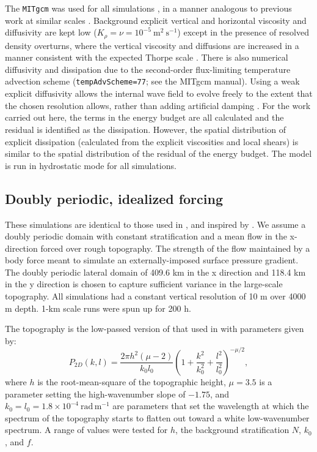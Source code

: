 \documentclass[twocol]{ametsocV5}
\begin{document}
The \verb+MITgcm+ was used for all simulations \citep{marshalletal97}, in a manner analogous to previous work at similar scales \citep{buijsmanetal14,klymaketal16b, klymak18}.  Background explicit vertical and horizontal viscosity and diffusivity are kept low ($K_{\rho} = \nu = 10^{-5}\ \mathrm{m^2\ s^{-1}}$) except in the presence of resolved density overturns, where the vertical viscosity and diffusions are increased in a manner consistent with the expected Thorpe scale \citep{klymaklegg10}.  There is also numerical diffusivity and dissipation due to the second-order flux-limiting temperature advection scheme (\verb+tempAdvScheme=77+; see the MITgcm manual).  Using a weak explicit diffusivity allows the internal wave field to evolve freely to the extent that the chosen resolution allows, rather than adding artificial damping \citep{ShakespeareHogg17}.  For the work carried out here, the terms in the energy budget are all calculated and the residual is identified as the dissipation.  However, the spatial distribution of explicit dissipation (calculated from the explicit viscosities and local shears) is similar to the spatial distribution of the residual of the energy budget.  The model is run in hydrostatic mode for all simulations.

\subsection{Doubly periodic, idealized forcing}

These simulations are identical to those used in \citet{klymak18}, and inspired by \citet{nikurashinferrari14}.  We assume a doubly periodic domain with constant stratification and a mean flow in the x-direction forced over rough topography.  The strength of the flow maintained by a body force meant to simulate an externally-imposed surface pressure gradient.  The doubly periodic lateral domain of 409.6 km in the x direction and 118.4 km in the y direction is chosen to capture sufficient variance in the large-scale topography. All simulations had a constant vertical resolution of 10 m over 4000 m depth.  1-km scale runs were spun up for 200 h.

The topography is the low-passed version of that used in \cite{klymak18} with parameters given by:
\begin{equation}
    P_{2D}(k,l) = \frac{2\pi h^2 \left(\mu-2 \right)}{k_0l_0}\left( 1 + \frac{k^2}{k_0^2} + \frac{l^2}{l_0^2}\right)^{-\mu/2} ,
    \label{eq:topo2d}
\end{equation}
where $h$ is the root-mean-square of the topographic height, $\mu=3.5$ is a parameter setting the high-wavenumber slope of $-1.75$, and $k_0=l_0 = 1.8\times10^{-4}\ \mathrm{rad\,m^{-1}}$ are parameters that set the wavelength at which the spectrum of the topography starts to flatten out toward a white low-wavenumber spectrum.  A range of values were tested for $h$, the background stratification $N$, $k_0$, and $f$.
\end{document}
